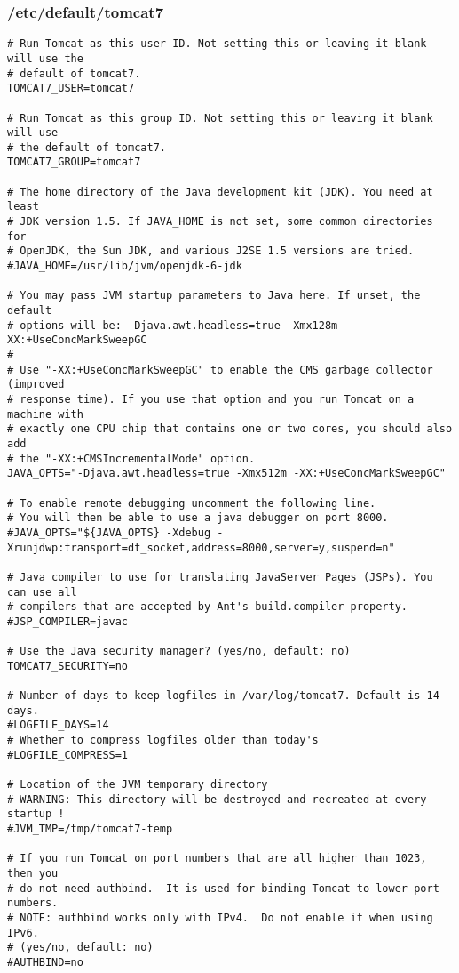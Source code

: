 \subsubsection{/etc/default/tomcat7}
\begin{lstlisting}
# Run Tomcat as this user ID. Not setting this or leaving it blank will use the
# default of tomcat7.
TOMCAT7_USER=tomcat7

# Run Tomcat as this group ID. Not setting this or leaving it blank will use
# the default of tomcat7.
TOMCAT7_GROUP=tomcat7

# The home directory of the Java development kit (JDK). You need at least
# JDK version 1.5. If JAVA_HOME is not set, some common directories for 
# OpenJDK, the Sun JDK, and various J2SE 1.5 versions are tried.
#JAVA_HOME=/usr/lib/jvm/openjdk-6-jdk

# You may pass JVM startup parameters to Java here. If unset, the default
# options will be: -Djava.awt.headless=true -Xmx128m -XX:+UseConcMarkSweepGC
#
# Use "-XX:+UseConcMarkSweepGC" to enable the CMS garbage collector (improved
# response time). If you use that option and you run Tomcat on a machine with
# exactly one CPU chip that contains one or two cores, you should also add
# the "-XX:+CMSIncrementalMode" option.
JAVA_OPTS="-Djava.awt.headless=true -Xmx512m -XX:+UseConcMarkSweepGC"

# To enable remote debugging uncomment the following line.
# You will then be able to use a java debugger on port 8000.
#JAVA_OPTS="${JAVA_OPTS} -Xdebug -Xrunjdwp:transport=dt_socket,address=8000,server=y,suspend=n"

# Java compiler to use for translating JavaServer Pages (JSPs). You can use all
# compilers that are accepted by Ant's build.compiler property.
#JSP_COMPILER=javac

# Use the Java security manager? (yes/no, default: no)
TOMCAT7_SECURITY=no

# Number of days to keep logfiles in /var/log/tomcat7. Default is 14 days.
#LOGFILE_DAYS=14
# Whether to compress logfiles older than today's
#LOGFILE_COMPRESS=1

# Location of the JVM temporary directory
# WARNING: This directory will be destroyed and recreated at every startup !
#JVM_TMP=/tmp/tomcat7-temp

# If you run Tomcat on port numbers that are all higher than 1023, then you
# do not need authbind.  It is used for binding Tomcat to lower port numbers.
# NOTE: authbind works only with IPv4.  Do not enable it when using IPv6.
# (yes/no, default: no)
#AUTHBIND=no
\end{lstlisting}

